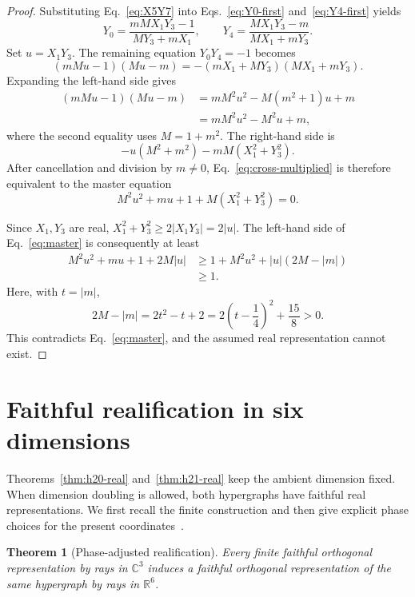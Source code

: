 \documentclass[twocolumn,aps,pra,floatfix,amsmath,amssymb,longbibliography]{revtex4-2}
\newtheorem{theorem}{Theorem}
\theoremstyle{definition}
\theoremstyle{remark}
\newcommand{\C}{\mathbb C}
\newcommand{\R}{\mathbb R}
\begin{document}
\begin{proof}
Substituting Eq.~\eqref{eq:X5Y7} into
Eqs.~\eqref{eq:Y0-first} and~\eqref{eq:Y4-first} yields
\begin{equation}
 Y_0=\frac{mMX_1Y_3-1}{MY_3+mX_1},\qquad
 Y_4=\frac{MX_1Y_3-m}{MX_1+mY_3}.
 \label{eq:Y0Y4-final}
\end{equation}
Set $u=X_1Y_3$.  The remaining equation $Y_0Y_4=-1$ becomes
\begin{equation}
 (mMu-1)(Mu-m)=-(mX_1+MY_3)(MX_1+mY_3).
 \label{eq:cross-multiplied}
\end{equation}
Expanding the left-hand side gives
\begin{align*}
 (mMu-1)(Mu-m)
 &=mM^2u^2-M(m^2+1)u+m\\
 &=mM^2u^2-M^2u+m,
\end{align*}
where the second equality uses $M=1+m^2$.
The right-hand side is
\[
 -u(M^2+m^2)-mM(X_1^2+Y_3^2).
\]
After cancellation and division by $m\ne0$, Eq.~\eqref{eq:cross-multiplied}
is therefore equivalent to the master equation
\begin{equation}
 M^2u^2+mu+1+M(X_1^2+Y_3^2)=0.
 \label{eq:master}
\end{equation}

Since $X_1,Y_3$ are real,
$X_1^2+Y_3^2\ge2|X_1Y_3|=2|u|$.  The left-hand side of
Eq.~\eqref{eq:master} is consequently at least
\begin{align*}
 M^2u^2+mu+1+2M|u|
 &\ge 1+M^2u^2+|u|(2M-|m|)\\
 &\ge1.
\end{align*}
Here, with $t=|m|$,
\[
 2M-|m|=2t^2-t+2=2\left(t-\frac14\right)^2+\frac{15}{8}>0.
\]
This contradicts
Eq.~\eqref{eq:master}, and the assumed real representation cannot exist.
\end{proof}

\section{Faithful realification in six dimensions}
\label{sec:realification}

Theorems~\ref{thm:h20-real} and~\ref{thm:h21-real} keep the ambient
dimension fixed.  When dimension doubling is allowed, both hypergraphs have
faithful real representations.  We first recall the finite construction and
then give explicit phase choices for the present
coordinates~\cite{svozil-2025-rvc}.

\begin{theorem}[Phase-adjusted realification]
\label{thm:realification}
Every finite faithful orthogonal representation by rays in $\C^3$ induces a
faithful orthogonal representation of the same hypergraph by rays in $\R^6$.
\end{theorem}
\end{document}
